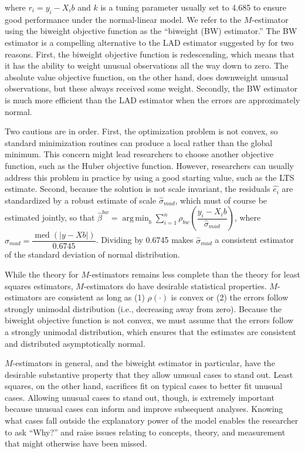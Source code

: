 \documentclass[12pt]{article}
\DeclareMathOperator*{\argmin}{arg\,min}
\DeclareMathOperator{\med}{med}
\begin{document}
\noindent where $r_i = y_i - X_ib$ and $k$ is a tuning parameter usually set to 4.685 to ensure good performance under the normal-linear model. 
We refer to the $M$-estimator using the biweight objective function as the ``biweight (BW) estimator.'' 
The BW estimator is a compelling alternative to the LAD estimator suggested by \cite{HardenDesmarais2011} for two reasons. 
First, the biweight objective function is redescending, which means that it has the ability to weight unusual observations all the way down to zero. 
The absolute value objective function, on the other hand, does downweight unusual observations, but these always received some weight. 
Secondly, the BW estimator is much more efficient than the LAD estimator when the errors are approximately normal. 

Two cautions are in order. 
First, the optimization problem is not convex, so standard minimization routines can produce a local rather than the global minimum. 
This concern might lead researchers to choose another objective function, such as the Huber objective function.
However, researchers can usually address this problem in practice by using a good starting value, such as the LTS estimate. 
Second, because the solution is not scale invariant, the residuals $\hat{e_i}$ are standardized by a robust estimate of scale $\hat{\sigma}_{mad}$, which must of course be estimated jointly, so that $\hat{\beta}^{bw} =\argmin_{b} \sum_{i = 1}^n \rho_{bw}\left(\dfrac{y_i - X_ib}{\hat{\sigma}_{mad}}\right)$, where $\hat{\sigma}_{mad} = \dfrac{\med\left( |y - Xb | \right)}{0.6745}$. 
Dividing by 0.6745 makes $\hat{\sigma}_{mad}$ a consistent estimator of the standard deviation of normal distribution.

While the theory for $M$-estimators remains less complete than the theory for least squares estimators, $M$-estimators do have desirable statistical properties. 
$M$-estimators are consistent as long as (1) $\rho(\cdot)$ is convex or (2) the errors follow strongly unimodal distribution (i.e., decreasing away from zero). 
Because the biweight objective function is not convex, we must assume that the errors follow a strongly unimodal distribution, which ensures that the estimates are consistent and distributed asymptotically normal.

$M$-estimators in general, and the biweight estimator in particular, have the desirable substantive property that they allow unusual cases to stand out.
Least squares, on the other hand, sacrifices fit on typical cases to better fit unusual cases. 
Allowing unusual cases to stand out, though, is extremely important because unusual cases can inform and improve subsequent analyses. 
Knowing what cases fall outside the explanatory power of the model enables the researcher to ask ``Why?'' and raise issues relating to concepts, theory, and measurement that might otherwise have been missed.
\end{document}
